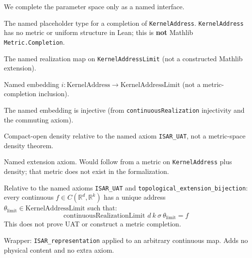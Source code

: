 We complete the parameter space only as a named interface.

\begin{axiom}
The named placeholder type for a completion of \texttt{KernelAddress}. \texttt{KernelAddress} has no metric or uniform structure in Lean; this is \textbf{not} Mathlib \texttt{Metric.Completion}.
\end{axiom}

\begin{axiom}
The named realization map on \texttt{KernelAddressLimit} (not a constructed Mathlib extension).
\end{axiom}

\begin{axiom}
Named embedding $i : \text{KernelAddress} \to \text{KernelAddressLimit}$ (not a metric-completion inclusion).
\end{axiom}

\begin{theorem}
The named embedding is injective (from \texttt{continuousRealization} injectivity and the commuting axiom).
\end{theorem}

\begin{theorem}
Compact-open density relative to the named axiom \texttt{ISAR\_UAT}, not a metric-space density theorem.
\end{theorem}

\begin{axiom}
Named extension axiom. Would follow from a metric on \texttt{KernelAddress} plus density; that metric does not exist in the formalization.
\end{axiom}

\begin{theorem}
Relative to the named axioms \texttt{ISAR\_UAT} and \texttt{topological\_extension\_bijection}: every continuous $f \in C(\mathbb{R}^d, \mathbb{R}^k)$ has a unique address $\theta_{\text{limit}} \in \text{KernelAddressLimit}$ such that:
$$\text{continuousRealizationLimit } d\ k\ \sigma\ \theta_{\text{limit}} = f$$
This does not prove UAT or construct a metric completion.
\end{theorem}

\begin{theorem}
Wrapper: \texttt{ISAR\_representation} applied to an arbitrary continuous map. Adds no physical content and no extra axiom.
\end{theorem}
